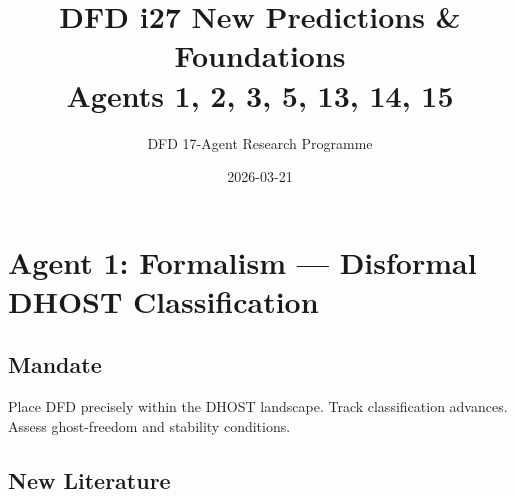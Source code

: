 \documentclass[11pt,a4paper]{article}
\title{DFD i27 New Predictions \& Foundations\\Agents 1, 2, 3, 5, 13, 14, 15}
\author{DFD 17-Agent Research Programme}
\date{2026-03-21}
\begin{document}
\maketitle
\tableofcontents
\newpage

\section{Agent 1: Formalism --- Disformal DHOST Classification}

\subsection{Mandate}
Place DFD precisely within the DHOST landscape. Track classification advances. Assess ghost-freedom and stability conditions.

\subsection{New Literature}
\end{document}
